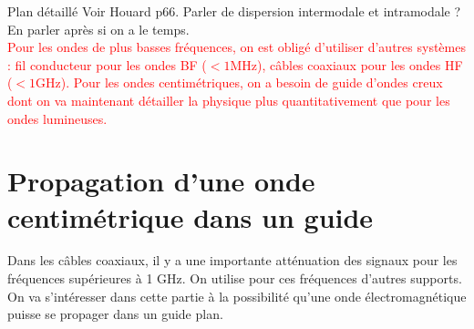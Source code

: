 \begin{reportBlock}{Plan détaillé}
  Voir Houard p66. Parler de dispersion intermodale et intramodale ? En parler après si on a le temps.\\

  \textcolor{red}{Pour les ondes de plus basses fréquences, on est obligé d'utiliser d'autres systèmes : fil conducteur pour les ondes BF ($<1$MHz), câbles coaxiaux pour les ondes HF ($<1$GHz). Pour les ondes centimétriques, on a besoin de guide d'ondes creux dont on va maintenant détailler la physique plus quantitativement que pour les ondes lumineuses.}
  
  \section{Propagation d'une onde centimétrique dans un guide}
   Dans les câbles coaxiaux, il y a une importante atténuation des signaux pour les fréquences supérieures à 1 GHz. On utilise pour ces fréquences d'autres supports. On va s'intéresser dans cette partie à la possibilité qu'une onde électromagnétique puisse se propager dans un guide plan. 

\end{reportBlock}
